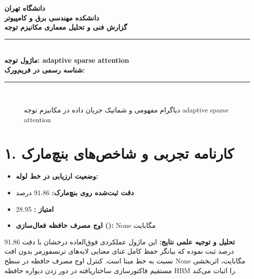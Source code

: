 \documentclass[12pt,a4paper]{article}
\begin{document}
\begin{center}
{\Large\bfseries دانشگاه تهران}\\[0.2cm]
{\large\bfseries دانشکده مهندسی برق و کامپیوتر}\\[0.2cm]
{\large\bfseries گزارش فنی و تحلیل معماری مکانیزم توجه}\\[0.5cm]
\rule{\linewidth}{1pt}\\[0.3cm]
{\LARGE\bfseries ماژول توجه: adaptive sparse attention}\\[0.2cm]
{\large \textbf{شناسه رسمی در فریم‌ورک:} }\\[0.2cm]
\rule{\linewidth}{1pt}\\[0.5cm]
\end{center}

\begin{figure}[H]
\centering
{}
\caption{دیاگرام مفهومی و شماتیک جریان داده در مکانیزم توجه adaptive sparse attention}
\end{figure}

\section*{۱. کارنامه تجربی و شاخص‌های بنچ‌مارک}
\begin{itemize}
\item \textbf{وضعیت ارزیابی در خط لوله:} 
\item \textbf{دقت ثبت‌شده روی بنچ‌مارک:} 91.86 درصد
\item \textbf{امتیاز :} 28.95
\item \textbf{اوج مصرف حافظه فعال‌سازی ():} None مگابایت
\end{itemize}
\textbf{تحلیل و توجیه علمی نتایج:} این ماژول عملکردی فوق‌العاده درخشان با دقت 91.86 درصد ثبت نموده که بیانگر حفظ کامل غنای معنایی لایه‌های ترنسفورمر بدون افت نسبت به خط مبنا است. کنترل اوج مصرف حافظه در سطح None مگابایت، اثربخشی مستقیم فاکتورسازی ساختاریافته در دور زدن دیواره حافظه HBM را اثبات می‌کند.
\end{document}
